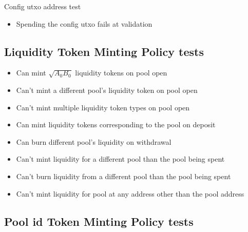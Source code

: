\documentclass{article}
\begin{document}
Config utxo address test

\begin{itemize}
	\item Spending the config utxo fails at validation
\end{itemize}

\subsection{Liquidity Token Minting Policy tests}

\begin{itemize}
	\item Can mint $\sqrt{A_0B_0}$ liquidity tokens on pool open
	\item Can't mint a different pool's liquidity token on pool open
	\item Can't mint multiple liquidity token types on pool open
	\item Can mint liquidity tokens corresponding to the pool on deposit
	\item Can burn different pool's liquidity on withdrawal
	\item Can't mint liquidity for a different pool than the pool being spent
	\item Can't burn liquidity from a different pool than the pool being spent
	\item Can't mint liquidity for pool at any address other than the pool address
\end{itemize}

\subsection{Pool id Token Minting Policy tests}
\end{document}
